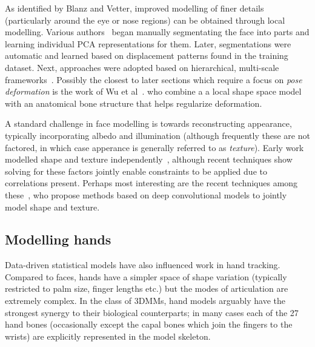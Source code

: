 As identified by Blanz and Vetter, improved modelling of finer details (particularly around the eye or nose regions) can be obtained through local modelling. Various authors~\cite{xxx} began manually segmentating the face into parts and learning individual PCA representations for them. Later, segmentations were automatic and learned based on displacement patterns found in the training dataset. Next, approaches were adopted based on hierarchical, multi-scale frameworks~\cite{xxx, xxx}. Possibly the closest to later sections which require a focus on \emph{pose deformation}  is the work of Wu et al~\cite{xxx}. who combine a a local shape space model with an anatomical bone structure that helps regularize deformation. 


A standard challenge in face modelling is towards reconstructing appearance, typically incorporating albedo and illumination (although frequently these are not factored, in which case apperance is generally referred to as \emph{texture}). Early work modelled shape and texture independently~\cite{xxx, xxx}, although recent techniques show solving for these factors jointly enable constraints to be applied due to correlations present. Perhaps most interesting are the recent techniques among these~\cite{xxx, xxx}, who propose methods based on deep convolutional models to jointly model shape and texture.  



\subsection{Modelling hands}




Data-driven statistical models have also influenced work in hand tracking. Compared to faces, hands have a simpler space of shape variation (typically restricted to palm size, finger lengths etc.) but the modes of articulation are extremely complex. In the class of 3DMMs, hand models arguably have the strongest synergy to their biological counterparts; in many cases each of the 27 hand bones (occasionally except the capal bones which join the fingers to the wrists) are explicitly represented in the model skeleton.

